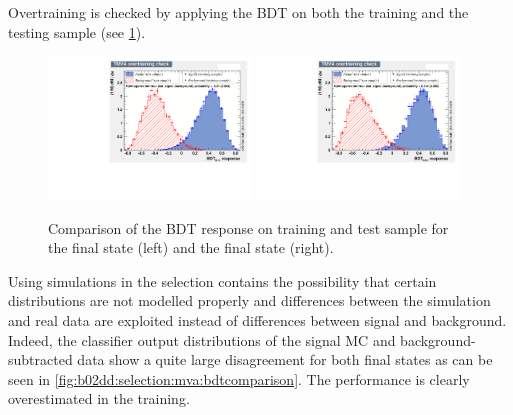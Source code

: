 Overtraining is checked by applying the BDT on both the training and the
testing sample (see \cref{fig:b02dd:selection:mva:overtraining}).
%
\begin{figure}[!htb]
\centering
\includegraphics[width=0.48\textwidth]{07-B02DD/figs/Overtraining_Check_Kpipi.pdf}
\includegraphics[width=0.48\textwidth]{07-B02DD/figs/Overtraining_Check_KKpi.pdf}
\caption{Comparison of the BDT response on training and test sample for the
\KpipiKpipi final state (left) and the \KKpiKpipi final state (right).}
\label{fig:b02dd:selection:mva:overtraining}
\end{figure}
%
Using simulations in the selection contains the possibility that certain
distributions are not modelled properly and differences between the simulation
and real data are exploited instead of differences between signal and
background. Indeed, the classifier output distributions of the signal MC and
background-subtracted data show a quite large disagreement for both final
states as can be seen in \cref{fig:b02dd:selection:mva:bdtcomparison}. The
performance is clearly overestimated in the training.
%
